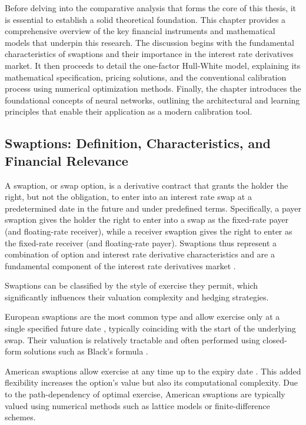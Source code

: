 Before delving into the comparative analysis that forms the core of this thesis, it is essential to establish a solid theoretical foundation. This chapter provides a comprehensive overview of the key financial instruments and mathematical models that underpin this research. The discussion begins with the fundamental characteristics of swaptions and their importance in the interest rate derivatives market. It then proceeds to detail the one-factor Hull-White model, explaining its mathematical specification, pricing solutions, and the conventional calibration process using numerical optimization methods. Finally, the chapter introduces the foundational concepts of neural networks, outlining the architectural and learning principles that enable their application as a modern calibration tool.

\subsection{Swaptions: Definition, Characteristics, and Financial Relevance} \label{swaptions}
A swaption, or swap option, is a derivative contract that grants the holder the right, but not the obligation, to enter into an interest rate swap at a predetermined date in the future and under predefined terms. Specifically, a payer swaption gives the holder the right to enter into a swap as the fixed-rate payer (and floating-rate receiver), while a receiver swaption gives the right to enter as the fixed-rate receiver (and floating-rate payer). Swaptions thus represent a combination of option and interest rate derivative characteristics and are a fundamental component of the interest rate derivatives market \parencite[pp.~19--20]{brigo2006interest}.

Swaptions can be classified by the style of exercise they permit, which significantly influences their valuation complexity and hedging strategies.

European swaptions are the most common type and allow exercise only at a single specified future date \parencite[p.~19]{brigo2006interest}, typically coinciding with the start of the underlying swap. Their valuation is relatively tractable and often performed using closed-form solutions such as Black’s formula \parencite{black1976pricing}.

American swaptions allow exercise at any time up to the expiry date \parencite{karlsson2016exercisepolicies}. This added flexibility increases the option’s value but also its computational complexity. Due to the path-dependency of optimal exercise, American swaptions are typically valued using numerical methods such as lattice models \parencite{gurrieri2009calibration} or finite-difference \parencite{longstaff2001valuingamericanoptions} schemes.

